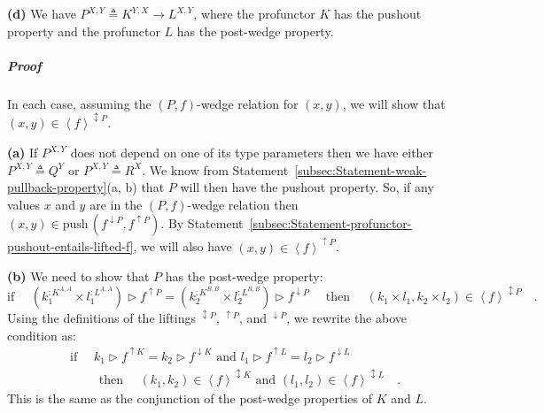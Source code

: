 \textbf{(d)} We have $P^{X,Y}\triangleq K^{Y,X}\rightarrow L^{X,Y}$,
where the profunctor $K$ has the pushout property and the profunctor
$L$ has the post-wedge property.%
\begin{comment}
\textbf{(e)} We have a recursive type $P^{X,Y}\triangleq S^{X,Y,P^{X,Y}}$,
where $S^{X,Y,R}$ is contravariant in $X$ and covariant in $Y$
and $R$, and has the post-wedge property when viewed as a profunctor
with respect to $X$ and $Y$. Does the post-wedge really hold for
$P$?
\end{comment}


\subparagraph{Proof}

In each case, assuming the $\left(P,f\right)$-wedge relation for
$(x,y)$, we will show that $(x,y)\in\left<f\right>^{\updownarrow P}$. 

\textbf{(a)} If $P^{X,Y}$ does not depend on one of its type parameters
then we have either $P^{X,Y}\triangleq Q^{Y}$ or $P^{X,Y}\triangleq R^{X}$.
We know from Statement~\ref{subsec:Statement-weak-pullback-property}(a,
b) that $P$ will then have the pushout property. So, if any values
$x$ and $y$ are in the $\left(P,f\right)$-wedge relation then $(x,y)\in\text{push}\,(f^{\downarrow P},f^{\uparrow P})$.
By Statement~\ref{subsec:Statement-profunctor-pushout-entails-lifted-f},
we will also have $(x,y)\in\left<f\right>^{\uparrow P}$.

\textbf{(b)} We need to show that $P$ has the post-wedge property:
\[
\text{if }\quad(k_{1}^{:K^{A,A}}\times l_{1}^{:L^{A,A}})\triangleright f^{\uparrow P}=(k_{2}^{:K^{B,B}}\times l_{2}^{:L^{B,B}})\triangleright f^{\downarrow P}\quad\text{ then }\quad(k_{1}\times l_{1},k_{2}\times l_{2})\in\left<f\right>^{\updownarrow P}\quad.
\]
Using the definitions of the liftings $^{\updownarrow P}$, $^{\uparrow P}$,
and $^{\downarrow P}$, we rewrite the above condition as:
\begin{align*}
 & \text{if }\quad k_{1}\triangleright f^{\uparrow K}=k_{2}\triangleright f^{\downarrow K}\text{ and }l_{1}\triangleright f^{\uparrow L}=l_{2}\triangleright f^{\downarrow L}\\
 & \quad\quad\text{ then }\quad(k_{1},k_{2})\in\left<f\right>^{\updownarrow K}\text{ and }(l_{1},l_{2})\in\left<f\right>^{\updownarrow L}\quad.
\end{align*}
This is the same as the conjunction of the post-wedge properties of
$K$ and $L$. 

